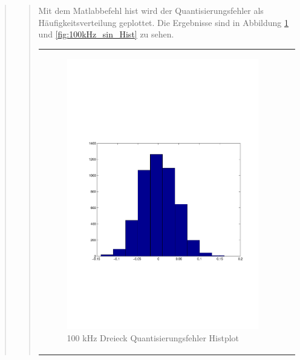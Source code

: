 \begin{quote}
\begin{quote}
	   	Mit dem Matlabbefehl hist wird der Quantisierungsfehler als Häufigkeitsverteilung geplottet. Die Ergebnisse sind in
	   	Abbildung \ref{fig:100kHz_drei_Hist} und \ref{fig:100kHz_sin_Hist} zu sehen.
	   	
	   		\begin{center}
            \begin{tabular}{ll}
            
            \hspace{-5cm}
                \begin{minipage}{0.6\textwidth}
                    \begin{figure}[H]
                        \includegraphics[scale=0.55, trim = 16mm 70mm 16mm 85mm, clip]{Bilder/100kHz_dreieck_Quant_Hist}
                          \caption{100 kHz Dreieck Quantisierungsfehler Histplot}
		                  \label{fig:100kHz_drei_Hist}
                    \end{figure}
                \end{minipage}
                

\end{tabular}
\end{center}
\end{quote}
\end{quote}

